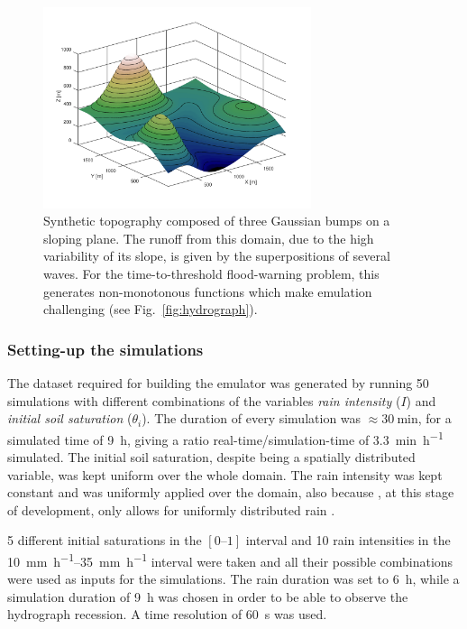 \begin{figure}[h]
  \centering
  \includegraphics[width=0.7\textwidth]{Figures/topography.png}
  \caption{Synthetic topography composed of three Gaussian bumps on a sloping plane. The runoff from this domain, due to the high variability of its slope, is given by the superpositions of several waves. For the time-to-threshold flood-warning problem, this generates non-monotonous functions which make emulation challenging (see Fig.~\ref{fig:hydrograph}).}
  \label{fig:topography}
\end{figure}

\subsubsection{Setting-up the simulations}
The dataset required for building the emulator was generated by running \num{50} simulations with different combinations of the variables \emph{rain intensity} ($I$) and \emph{initial soil saturation} ($\theta_i$).
The duration of every simulation was $\approx \SI{30}{\minute}$, for a simulated time of \SI{9}{\hour}, giving a ratio real-time/simulation-time of \SI{3.3}{\minute\per\hour} simulated.
The initial soil saturation, despite being a spatially distributed variable, was kept uniform over the whole domain.
The rain intensity was kept constant and was uniformly applied over the domain, also because , at this stage of development, only allows for uniformly distributed rain \autocite{laguerre_documentation_2016}.

\num{5} different initial saturations in the $[\numrange{0}{1}]$ interval and \num{10} rain intensities in the \SIrange{10}{35}{\milli\metre\per\hour} interval were taken and all their possible combinations were used as inputs for the simulations.
The rain duration was set to \SI{6}{\hour}, while a simulation duration of \SI{9}{\hour} was chosen in order to be able to observe the hydrograph recession. A time resolution of \SI{60}{\second} was used.

